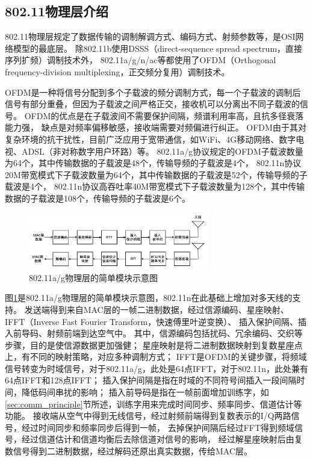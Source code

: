 		\subsection{802.11物理层介绍}
		802.11物理层规定了数据传输的调制解调方式、编码方式、射频参数等，是OSI网络模型的最底层。
		除802.11b使用DSSS（direct-sequence spread spectrum，直接序列扩频）调制技术外，
		802.11a/g/n/ac等都使用了OFDM（Orthogonal frequency-division multiplexing，正交频分复用）调制技术。

		OFDM是一种将信号分配到多个子载波的频分调制方式，每一个子载波的调制后信号有部分重叠，但因为子载波之间严格正交，接收机可以分离出不同子载波的信号。
		OFDM的优点是在子载波间不需要保护间隔，频谱利用率高，且抗多径衰落能力强，
		缺点是对频率偏移敏感，接收端需要对频偏进行纠正\cite{book06commprin}。
		OFDM由于其对复杂环境的抗干扰性，目前广泛应用于宽带通信，如WiFi、4G移动网络、数字电视、ADSL（非对称数字用户环路）等。
		802.11a/g协议规定的OFDM子载波数量为64个，其中传输数据的子载波是48个，传输导频的子载波是4个，
		802.11n协议20M带宽模式下子载波数量为64个，其中传输数据的子载波是52个，传输导频的子载波是4个，
		802.11n协议高吞吐率40M带宽模式下子载波数量为128个，其中传输数据的子载波是108个，传输导频的子载波是6个\cite{ieee80211}。

		\begin{figure}[H]
			\centering
			\includegraphics[width=0.7\textwidth]{img/80211_phy_module.png}
			\caption{802.11a/g物理层的简单模块示意图}
			\label{fig:80211_phy_module}
		\end{figure}

		图\ref{fig:80211_phy_module}是802.11a/g物理层的简单模块示意图，802.11n在此基础上增加对多天线的支持。
		发送端得到来自MAC层的一帧二进制数据，经过信源编码、星座映射、IFFT（Inverse Fast Fourier Transform，快速傅里叶逆变换）、
		插入保护间隔、插入前导码、射频前端到达空气中。
		其中，信源编码包括扰码、冗余编码、交织等步骤，目的是使信源数据更加强健；
		星座映射是将二进制数据映射到复数星座点上，有不同的映射策略，对应多种调制方式；
		IFFT是OFDM的关键步骤，将频域信号转变为时域信号，对于802.11a/g，此处是64点IFFT，对于802.11n，此处兼有64点IFFT和128点IFFT；
		插入保护间隔是指在时域的不同符号间插入一段间隔时间，降低码间串扰的影响；
		插入前导码是指在一帧前面增加训练字，如\ref{sec:comm_principle}节所述，训练字用来完成时间同步、频率同步、信道估计等功能。
		接收端从空气中得到无线信号，经过射频前端得到复数表示的I/Q两路信号，经过时间同步和频率同步后得到一帧，
		去掉保护间隔后经过FFT得到频域信号，经过信道估计和信道均衡后去除信道对信号的影响，
		经过解星座映射后由复数信号得到二进制数据，经过解码还原出真实数据，传给MAC层。

